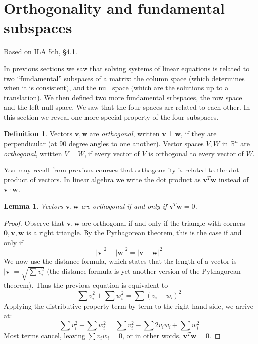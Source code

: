 \documentclass[11pt,oneside]{amsbook}
\newcommand{\R}{\mathbb R}
\theoremstyle{definition}
\theoremstyle{plain}
\newtheorem{lemma}[theorem]{Lemma}
\theoremstyle{definition}
\newtheorem{definition}[theorem]{Definition}
\theoremstyle{remark}
\numberwithin{equation}{section}
\numberwithin{figure}{section}
\begin{document}
\newpage
\section{Orthogonality and fundamental subspaces}

Based on ILA 5th, \S 4.1.

In previous sections we saw that solving systems of linear equations is related to two ``fundamental'' subspaces of a matrix: the column space (which determines when it is consistent), and the null space (which are the solutions up to a translation). We then defined two more fundamental subspaces, the row space and the left null space. We saw that the four spaces are related to each other. In this section we reveal one more special property of the four subspaces.

\begin{definition}
  Vectors $\bm{v},\bm{w}$ are \emph{orthogonal}, written $\bm{v}\perp\bm{w}$, if they are perpendicular (at 90 degree angles to one another). Vector spaces $V,W$ in $\R^n$ are \emph{orthogonal}, written $V\perp W$, if every vector of $V$ is orthogonal to every vector of $W$.
\end{definition}

You may recall from previous courses that orthogonality is related to the dot product of vectors. In linear algebra we write the dot product as $\bm{v}^T\bm{w}$ instead of $\bm{v}\cdot\bm{w}$.

\begin{lemma}
  Vectors $\bm{v},\bm{w}$ are orthogonal if and only if $\bm{v}^T\bm{w}=0$.
\end{lemma}

\begin{proof}
  Observe that $\bm{v},\bm{w}$ are orthogonal if and only if the triangle with corners $\bm{0},\bm{v},\bm{w}$ is a right triangle. By the Pythagorean theorem, this is the case if and only if
  \[|\bm{v}|^2+|\bm{w}|^2=|\bm{v-w}|^2
  \]
  We now use the distance formula, which states that the length of a vector is $|\bm{v}|=\sqrt{\sum v_i^2}$ (the distance formula is yet another version of the Pythagorean theorem). Thus the previous equation is equivalent to
  \[\sum v_i^2+\sum w_i^2=\sum(v_i-w_i)^2
  \]
  Applying the distributive property term-by-term to the right-hand side, we arrive at:
  \[\sum v_i^2+\sum w_i^2=\sum v_i^2-\sum 2v_iw_i+\sum w_i^2
  \]
  Most terms cancel, leaving $\sum v_iw_i=0$, or in other words, $\bm{v}^T\bm{w}=0$.
\end{proof}
\end{document}
